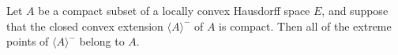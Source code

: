 Let $A$ be a compact subset of a locally convex Hausdorff space $E$, and suppose that the closed convex extension $\langle A \rangle^-$ of $A$ is compact. Then all of the extreme points of $\langle A \rangle^-$ belong to $A$.
